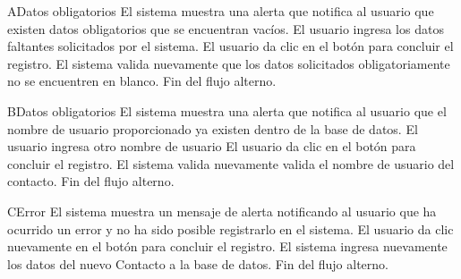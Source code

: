 		\begin{UCtrayectoriaA}{A}{Datos obligatorios}
			\UCpaso El sistema muestra una alerta que notifica al usuario que existen datos obligatorios que se encuentran vac\'ios.
			\UCpaso[\UCactor]  El usuario ingresa los datos faltantes solicitados por el sistema.
			\UCpaso[] El usuario da clic en el bot\'on  para concluir el registro.
			\UCpaso El sistema valida nuevamente que los datos solicitados obligatoriamente no se encuentren en blanco.
			\UCpaso[] Fin del flujo alterno.
		\end{UCtrayectoriaA}

		\begin{UCtrayectoriaA}{B}{Datos obligatorios}
			\UCpaso El sistema muestra una alerta que notifica al usuario que el nombre de usuario proporcionado ya existen dentro de la base de datos.
			\UCpaso[\UCactor]  El usuario ingresa otro nombre de usuario
			\UCpaso[] El usuario da clic en el bot\'on  para concluir el registro.
			\UCpaso El sistema valida nuevamente valida el nombre de usuario del contacto.
			\UCpaso[] Fin del flujo alterno.
		\end{UCtrayectoriaA}
		
		\begin{UCtrayectoriaA}{C}{Error}
			\UCpaso El sistema muestra un mensaje de alerta notificando al usuario que ha ocurrido un error y no ha sido posible registrarlo en el sistema.
			\UCpaso[\UCactor] El usuario da clic nuevamente en el bot\'on  para concluir el registro.
			\UCpaso El sistema ingresa nuevamente los datos del nuevo Contacto a la base de datos.
			\UCpaso[] Fin del flujo alterno.
			
		\end{UCtrayectoriaA}
		
		
